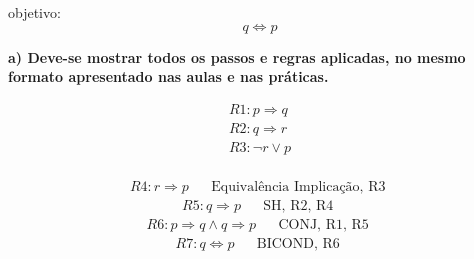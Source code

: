 objetivo: 
\begin{equation*}
    q \Leftrightarrow p
\end{equation*}



\begin{adjustwidth}{1em}{}
\textbf{a) Deve-se mostrar todos os passos e regras aplicadas, no mesmo formato
apresentado nas aulas e nas práticas.}
\end{adjustwidth}






\begin{equation*}
    \begin{gathered}
        R1: p \Rightarrow q \\
        R2: q \Rightarrow r \\
        R3: \neg{r} \lor p \\
    \end{gathered}
\end{equation*}


\begin{align*}
    R4: r \Rightarrow p && \text{Equivalência Implicação, R3 }
\end{align*}
\begin{align*}
    R5: q \Rightarrow p && \text{SH, R2, R4 }
\end{align*}
\begin{align*}
    R6: p \Rightarrow q \land q \Rightarrow p && \text{CONJ, R1, R5 }
\end{align*}
\begin{align*}
    R7: q \Leftrightarrow p && \text{BICOND, R6 }
\end{align*}

